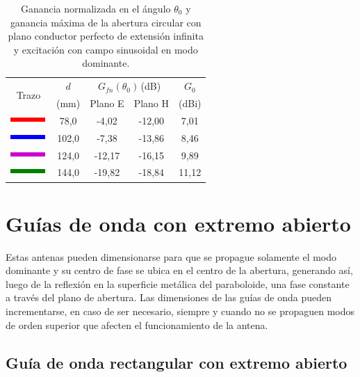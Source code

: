 \begin{table}[H]
\centering
\begin{tabular}{|c|c|c|c|c|}
\hline
\multirow{2}{*}{Trazo} & $d$ & \multicolumn{2}{c|}{$G_{fn}\left(\theta_0\right)\,$(dB)} & $G_0$ \\
\cline{3-4}
& (mm) & Plano E & Plano H & (dBi)\\
\hline
\includegraphics[scale = 1]{Figures/Estudio/linea_tabla_rojo} & 78,0 & -4,02 & -12,00 & 7,01 \\
\hline
\includegraphics[scale = 1]{Figures/Estudio/linea_tabla_azul} & 102,0 & -7,38 & -13,86 & 8,46 \\
\hline
\includegraphics[scale = 1]{Figures/Estudio/linea_tabla_violeta} & 124,0 & -12,17 & -16,15 & 9,89 \\
\hline
\includegraphics[scale = 1]{Figures/Estudio/linea_tabla_verde} & 144,0 & -19,82 & -18,84 & 11,12 \\
\hline
\end{tabular}
\caption{Ganancia normalizada en el ángulo $\theta_0$ y ganancia máxima de la abertura circular con plano conductor perfecto de extensión infinita y excitación con campo sinusoidal en modo dominante.}
\label{tabla_estudio:4}
\end{table}

\section{Guías de onda con extremo abierto}
\label{sec_estudio_guias}

Estas antenas pueden dimensionarse para que se propague solamente el modo dominante y su centro de fase se ubica en el centro de la abertura, generando así, luego de la reflexión en la superficie metálica del paraboloide, una fase constante a través del plano de abertura. Las dimensiones de las guías de onda pueden incrementarse, en caso de ser necesario, siempre y cuando no se propaguen modos de orden superior que afecten el funcionamiento de la antena.

\subsection{Guía de onda rectangular con extremo abierto}
\label{subsec_estudio_guia_rect}

